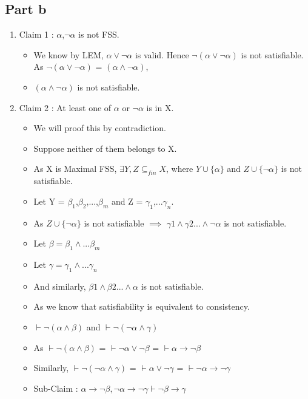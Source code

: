 \documentclass[12pt]{scrartcl}
\begin{document}
\subsection{Part b}
\begin{enumerate}
    \item Claim 1 : {$\alpha$,$\neg \alpha$} is not FSS.
    \begin{itemize}
        \item We know by LEM, $\alpha \vee \neg \alpha$ is valid. Hence $\neg(\alpha \vee \neg \alpha)$ is not satisfiable. As $\neg(\alpha \vee \neg \alpha)$ = $(\alpha \wedge \neg \alpha)$,
        \item  $(\alpha \wedge \neg \alpha)$ is not satisfiable.
    \end{itemize}
    \item Claim 2 : At least one of $\alpha$ or $\neg \alpha$ is in X.
    \begin{itemize}
        \item We will proof this by contradiction.
        \item Suppose neither of them belongs to X.
        \item As X is Maximal FSS, $\exists Y,Z \subseteq_{fin} X$, where $Y \cup \{\alpha\}$ and $Z \cup \{\neg \alpha\}$ is not satisfiable.
        \item Let Y = {$\beta_1$,$\beta_2$,...,$\beta_m$} and Z = {$\gamma_1$,...$\gamma_n$}.
        \item As $Z \cup \{\neg\alpha\}$ is not satisfiable $\implies$ $\gamma1 \wedge \gamma2... \wedge \neg \alpha$ is not satisfiable.
        \item Let $\beta = \beta_1 \wedge ... \beta_m$
        \item  Let $\gamma = \gamma_1 \wedge ... \gamma_n$
        \item  And similarly, $\beta1 \wedge \beta2... \wedge \alpha$ is not satisfiable.
        \item As we know that satisfiability is equivalent to consistency.
        \item $\vdash \neg(\alpha \wedge \beta)$ and $\vdash \neg(\neg \alpha \wedge \gamma)$
        \item As $\vdash \neg(\alpha \wedge \beta)$ = $\vdash \neg \alpha \vee \neg \beta$ = $\vdash \alpha \rightarrow \neg \beta$
        \item  Similarly, $\vdash \neg(\neg \alpha \wedge \gamma)$ = $\vdash \alpha \vee \neg \gamma$ = $\vdash \neg \alpha \rightarrow \neg \gamma$
        \item Sub-Claim : $\alpha \rightarrow \neg \beta, \neg \alpha \rightarrow \neg \gamma \vdash \neg \beta \rightarrow \gamma$

\end{itemize}
\end{enumerate}
\end{document}

